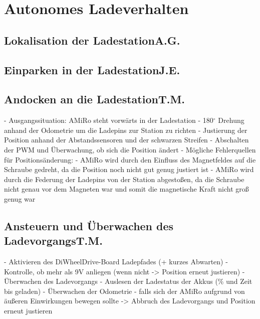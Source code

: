 \chapter{Autonomes Ladeverhalten} \label{kap:AutonomesLadeverhalten}

\section[Lokalisation der Ladestation]{Lokalisation der Ladestation\hfill {\normalsize A.G.}} %

\section[Einparken in der Ladestation]{Einparken in der Ladestation\hfill {\normalsize J.E.}} %

\section[Andocken an die Ladestation]{Andocken an die Ladestation\hfill {\normalsize T.M.}} %
- Ausgangssituation: AMiRo steht vorwärts in der Ladestation
- 180$^\circ$ Drehung anhand der Odometrie um die Ladepins zur Station zu richten
- Justierung der Position anhand der Abstandssensoren und der schwarzen Streifen
- Abschalten der PWM und Überwachung, ob sich die Position ändert 
	- Mögliche Fehlerquellen für Positionsänderung: 
		- AMiRo wird durch den Einfluss des Magnetfeldes auf die Schraube gedreht, da die Position noch nicht gut genug justiert ist
		- AMiRo wird durch die Federung der Ladepins von der Station abgestoßen, da die Schraube nicht genau vor dem Magneten war und somit die magnetische Kraft nicht groß genug war 

\section[Ansteuern und Überwachen des Ladevorgangs]{Ansteuern und Überwachen des Ladevorgangs\hfill {\normalsize T.M.}} %
- Aktivieren des DiWheelDrive-Board Ladepfades (+ kurzes Abwarten)
- Kontrolle, ob mehr als 9V anliegen (wenn nicht -> Position erneut justieren)
- Überwachen des Ladevorgangs
	- Auslesen der Ladestatus der Akkus (\% und Zeit bis geladen)
	- Überwachen der Odometrie 
		- falls sich der AMiRo aufgrund von äußeren Einwirkungen bewegen sollte -> Abbruch des Ladevorgangs und Position erneut justieren

